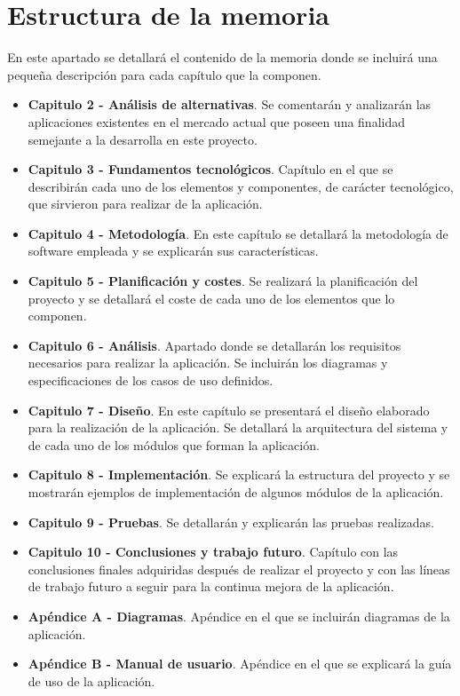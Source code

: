 \section{Estructura de la memoria}
En este apartado se detallará el contenido de la memoria donde se incluirá una pequeña descripción para cada capítulo que la componen.

\begin{itemize}
	\item \textbf{Capitulo 2 - Análisis de alternativas}. Se comentarán y analizarán las aplicaciones existentes en el mercado actual que poseen una finalidad semejante a la desarrolla en este proyecto.  
	\item \textbf{Capitulo 3 - Fundamentos tecnológicos}. Capítulo en el que se describirán cada uno de los elementos y componentes, de carácter tecnológico, que sirvieron para realizar de la aplicación.
	\item \textbf{Capitulo 4 - Metodología}. En este capítulo se detallará la metodología de software empleada y se explicarán sus características.
	\item \textbf{Capitulo 5 - Planificación y costes}. Se realizará la planificación del proyecto y se detallará el coste de cada uno de los elementos que lo componen.
	\item \textbf{Capitulo 6 - Análisis}. Apartado donde se detallarán los requisitos necesarios para realizar la aplicación. Se incluirán los diagramas y especificaciones de los casos de uso definidos.
	\item \textbf{Capitulo 7 - Diseño}. En este capítulo se presentará el diseño elaborado para la realización de la aplicación. Se detallará la arquitectura del sistema y de cada uno de los módulos que forman la aplicación.
	\item \textbf{Capitulo 8 - Implementación}. Se explicará la estructura del proyecto y se mostrarán ejemplos de implementación de algunos módulos de la aplicación.
	\item \textbf{Capitulo 9 - Pruebas}. Se detallarán y explicarán las pruebas realizadas.
	\item \textbf{Capitulo 10 - Conclusiones y trabajo futuro}. Capítulo con las conclusiones finales adquiridas después de realizar el proyecto y con las líneas de trabajo futuro a seguir para la continua mejora de la aplicación.
	\item \textbf{Apéndice A - Diagramas}. Apéndice en el que se incluirán diagramas de la aplicación.
	\item \textbf{Apéndice B - Manual de usuario}. Apéndice en el que se explicará la guía de uso de la aplicación.
\end{itemize}

















